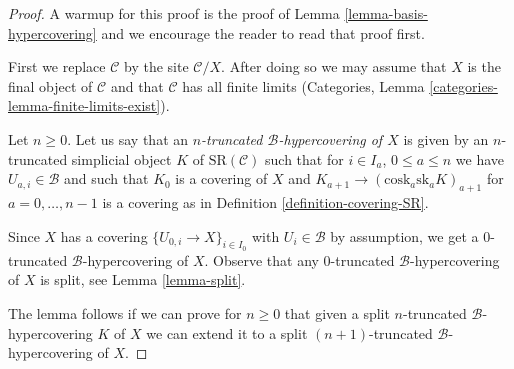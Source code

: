 \begin{proof}
A warmup for this proof is the proof of
Lemma \ref{lemma-basis-hypercovering} and
we encourage the reader to read that proof first.

\medskip\noindent
First we replace $\mathcal{C}$ by the site $\mathcal{C}/X$.
After doing so we may assume that $X$ is the final object
of $\mathcal{C}$ and that $\mathcal{C}$ has all finite limits
(Categories, Lemma \ref{categories-lemma-finite-limits-exist}).

\medskip\noindent
Let $n \geq 0$. Let us say that an
{\it $n$-truncated $\mathcal{B}$-hypercovering of $X$}
is given by an $n$-truncated simplicial object $K$
of $\text{SR}(\mathcal{C})$
such that for $i \in I_a$, $0 \leq a \leq n$
we have $U_{a, i} \in \mathcal{B}$ and such that
$K_0$ is a covering of $X$ and
$K_{a + 1} \to (\text{cosk}_a \text{sk}_a K)_{a + 1}$
for $a = 0, \ldots, n - 1$
is a covering as in Definition \ref{definition-covering-SR}.

\medskip\noindent
Since $X$ has a covering $\{U_{0, i} \to X\}_{i \in I_0}$
with $U_i \in \mathcal{B}$ by assumption, we get a $0$-truncated
$\mathcal{B}$-hypercovering of $X$. Observe that any $0$-truncated
$\mathcal{B}$-hypercovering of $X$ is split, see
Lemma \ref{lemma-split}.

\medskip\noindent
The lemma follows if we can prove for $n \geq 0$ that given a
split $n$-truncated $\mathcal{B}$-hypercovering $K$ of $X$
we can extend it to a
split $(n + 1)$-truncated $\mathcal{B}$-hypercovering of $X$.


\end{proof}
